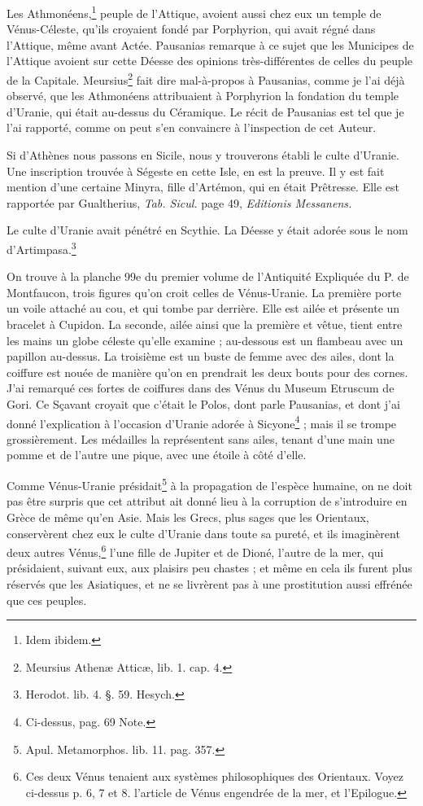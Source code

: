 \documentclass[a4paper, 11pt, oneside, polutonikogreek, french]{article}
\begin{document}
Les Athmonéens,\footnote{Idem ibidem.} peuple de l'Attique, avoient aussi chez eux un temple de Vénus-Céleste, qu'ils croyaient fondé par Porphyrion, qui avait régné dans l'Attique, même avant Actée. Pausanias remarque à ce sujet que les Municipes de l'Attique avoient sur cette Déesse des opinions très-différentes de celles du peuple de la Capitale. Meursius\footnote{Meursius Athenæ Atticæ, lib. 1. cap. 4.} fait dire mal-à-propos à Pausanias, comme je l'ai déjà observé, que les Athmonéens attribuaient à Porphyrion la fondation du temple d'Uranie, qui était au-dessus du Céramique. Le récit de Pausanias est tel que je l'ai rapporté, comme on peut s'en convaincre à l'inspection de cet Auteur.

Si d'Athènes nous passons en Sicile, nous y trouverons établi le culte d'Uranie. Une inscription trouvée à Ségeste en cette Isle, en est la preuve. Il y est fait mention d'une certaine Minyra, fille d'Artémon, qui en était Prêtresse. Elle est rapportée par Gualtherius, \emph{Tab. Sicul.} page 49, \emph{Editionis Messanens.}

Le culte d'Uranie avait pénétré en Scythie. La Déesse y était adorée sous le nom d'Artimpasa.\footnote{Herodot. lib. 4. §. 59. Hesych.}

On trouve à la planche 99e du premier volume de l'Antiquité Expliquée du P. de Montfaucon, trois figures qu'on croit celles de Vénus-Uranie. La première porte un voile attaché au cou, et qui tombe par derrière. Elle est ailée et présente un bracelet à Cupidon. La seconde, ailée ainsi que la première et vêtue, tient entre les mains un globe céleste qu'elle examine ; au-dessous est un flambeau avec un papillon au-dessus. La troisième est un buste de femme avec des ailes, dont la coiffure est nouée de manière qu'on en prendrait les deux bouts pour des cornes. J'ai remarqué ces fortes de coiffures dans des Vénus du Museum Etruscum de Gori. Ce Sçavant croyait que c'était le Polos, dont parle Pausanias, et dont j'ai donné l'explication à l'occasion d'Uranie adorée à Sicyone\footnote{Ci-dessus, pag. 69 Note.} ; mais il se trompe grossièrement. Les médailles la représentent sans ailes, tenant d'une main une pomme et de l'autre une pique, avec une étoile à côté d'elle.

Comme Vénus-Uranie présidait\footnote{Apul. Metamorphos. lib. 11. pag. 357.} à la propagation de l'espèce humaine, on ne doit pas être surpris que cet attribut ait donné lieu à la corruption de s'introduire en Grèce de même qu'en Asie. Mais les Grecs, plus sages que les Orientaux, conservèrent chez eux le culte d'Uranie dans toute sa pureté, et ils imaginèrent deux autres Vénus,\footnote{Ces deux Vénus tenaient aux systèmes philosophiques des Orientaux. Voyez ci-dessus p. 6, 7 et 8. l'article de Vénus engendrée de la mer, et l'Epilogue.} l'une fille de Jupiter et de Dioné, l'autre de la mer, qui présidaient, suivant eux, aux plaisirs peu chastes ; et même en cela ils furent plus réservés que les Asiatiques, et ne se livrèrent pas à une prostitution aussi effrénée que ces peuples.
\end{document}
